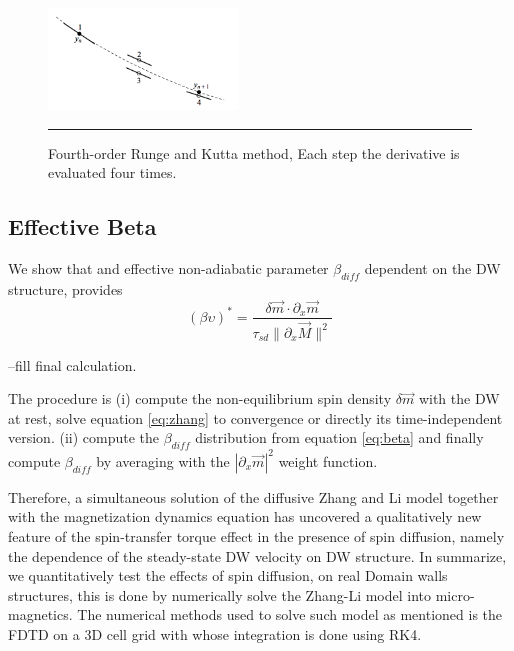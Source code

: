 \begin{figure}[htbp]
	\centering
		\includegraphics[width=0.45\textwidth]{Figures/rk4.png}
		\rule{35em}{0.5pt}
	\caption[Fourth-order Runge and Kutta Method]{Fourth-order Runge and Kutta method, Each step the derivative is evaluated four times. }
	\label{fig:kutta}
\end{figure}

\subsection{Effective Beta}

We show that and effective non-adiabatic parameter $\beta_{diff}$ dependent on the DW structure, provides 
\begin{equation} \label{eq:beta}
(\beta \upsilon)^{*} = \frac{\delta\vec{m} \cdot \partial_x \vec{m}}{\tau_{sd} \| \partial_x \vec{M} \|^2}
\end{equation}


--fill final calculation.


The procedure is (i) compute the non-equilibrium spin density $\delta \vec{m}$ with the DW at rest, solve equation \ref{eq:zhang} to convergence or directly its time-independent version. (ii) compute the $\beta_{diff}$ distribution from equation \ref{eq:beta} and finally compute $\beta_{diff}$ by averaging with the $| \partial_x \vec{m}|^2$ weight function.


\vspace{3.5em}

Therefore, a simultaneous solution of the diffusive Zhang and Li model together with the magnetization dynamics equation has uncovered a qualitatively new feature of the spin-transfer torque effect in the presence of spin diffusion, namely the dependence of the steady-state DW velocity on DW structure. In summarize, we quantitatively test the effects of spin diffusion, on real Domain walls structures, this is done by numerically solve the Zhang-Li model into micro-magnetics. The numerical methods used to solve such model as mentioned is the FDTD on a 3D cell grid with whose integration is done using RK4.






